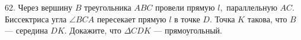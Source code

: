 62. Через вершину $B$ треугольника $ABC$ провели прямую $l,$ параллельную $AC.$ Биссектриса угла $\angle BCA$ пересекает прямую $l$ в точке $D.$ Точка $K$ такова, что $B$ --- середина $DK.$ Докажите, что $\Delta CDK$ --- прямоугольный.\\
